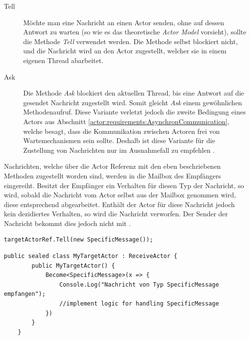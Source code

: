 \begin{description}
    \item[Tell] Möchte man eine Nachricht an einen Actor senden, ohne auf dessen Antwort zu warten (so wie es das theoretische \textit{Actor Model} vorsieht), sollte die Methode \textit{Tell} verwendet werden. Die Methode selbst blockiert nicht, und die Nachricht wird an den Actor zugestellt, welcher sie in einem eigenen Thread abarbeitet. 
% 
% 
    \item[Ask] Die Methode \textit{Ask} blockiert den aktuellen Thread, bis eine Antwort auf die gesendet Nachricht zugestellt wird. Somit gleicht \textit{Ask} einem gewöhnlichen Methodenaufruf. Diese Variante verletzt jedoch die zweite Bedingung eines Actors aus Abschnitt \ref{actor:requirements:AsynchronCommunication}, welche besagt, dass die Kommunikation zwischen Actoren frei von Wartemechanismen sein sollte. Deshalb ist diese Variante für die Zustellung von Nachrichten nur im Ausnahmefall zu empfehlen \citep{Akka.netCommunityAkka.NETDocumentation}.  
\end{description}
Nachrichten, welche über die Actor Referenz mit den eben beschriebenen Methoden zugestellt worden sind, werden in die Mailbox des Empfängers eingereiht. Besitzt der Empfänger ein Verhalten für diesen Typ der Nachricht, so wird, sobald die Nachricht vom Actor selbst aus der Mailbox genommen wird, diese entsprechend abgearbeitet. Enthält der Actor für diese Nachricht jedoch kein de­zi­diertes Verhalten, so wird die Nachricht verworfen. Der Sender der Nachricht bekommt dies jedoch nicht mit \citep{akkaInAction}.  

\begin{lstlisting}[caption=Versenden einer Nachricht an einen anderen Actor, label=code:actor:TellMethod]
    targetActorRef.Tell(new SpecificMessage());
\end{lstlisting}

\begin{lstlisting}[caption=Hier wird für den Actor \textit{MyTargetActor} das Verhalten für eine einkommende Nachricht vom Typ \textit{SpecificMessage} festgelegt., label=lst:test]
    public sealed class MyTargetActor : ReceiveActor {
        public MyTargetActor() {
            Become<SpecificMessage>(x => {
                Console.Log("Nachricht von Typ SpecificMessage empfangen");
                //implement logic for handling SpecificMessage
            })
        }
    }    
\end{lstlisting}

